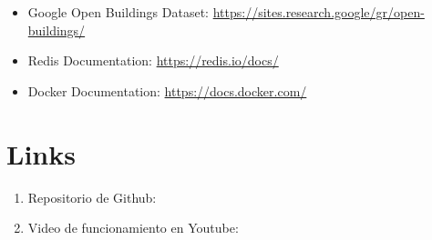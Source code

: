\documentclass[letter,12pt]{article}
\begin{document}
\begin{itemize}
    \item Google Open Buildings Dataset: \url{https://sites.research.google/gr/open-buildings/}
    \item Redis Documentation: \url{https://redis.io/docs/}
    \item Docker Documentation: \url{https://docs.docker.com/}
\end{itemize}

\section*{Links}
\begin{enumerate}
    \item Repositorio de Github:
    \item Video de funcionamiento en Youtube:
\end{enumerate}
\end{document}
